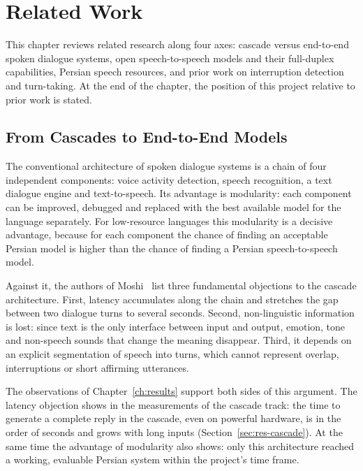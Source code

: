 \chapter{Related Work}
\label{ch:literature}

This chapter reviews related research along four axes: cascade versus end-to-end
spoken dialogue systems, open speech-to-speech models and their full-duplex
capabilities, Persian speech resources, and prior work on interruption detection
and turn-taking. At the end of the chapter, the position of this project relative
to prior work is stated.

\section{From Cascades to End-to-End Models}
\label{sec:cascade-vs-e2e}

The conventional architecture of spoken dialogue systems is a chain of four
independent components: voice activity detection, speech recognition, a text
dialogue engine and text-to-speech. Its advantage is modularity: each component can
be improved, debugged and replaced with the best available model for the language
separately. For low-resource languages this modularity is a decisive advantage,
because for each component the chance of finding an acceptable Persian model is
higher than the chance of finding a Persian speech-to-speech model.

Against it, the authors of Moshi~\cite{defossez2024moshi} list three fundamental
objections to the cascade architecture. First, latency accumulates along the chain
and stretches the gap between two dialogue turns to several seconds. Second,
non-linguistic information is lost: since text is the only interface between input
and output, emotion, tone and non-speech sounds that change the meaning disappear.
Third, it depends on an explicit segmentation of speech into turns, which cannot
represent overlap, interruptions or short affirming utterances.

The observations of Chapter~\ref{ch:results} support both sides of this argument.
The latency objection shows in the measurements of the cascade track: the time to
generate a complete reply in the cascade, even on powerful hardware, is in the order
of seconds and grows with long inputs (Section~\ref{sec:res-cascade}). At the same
time the advantage of modularity also shows: only this architecture reached a
working, evaluable Persian system within the project's time frame.

